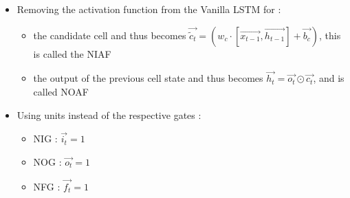 \begin{itemize}
  \item Removing the activation function from the Vanilla \ac{LSTM} for :
    \begin{itemize}
      \item the candidate cell and thus becomes $ \overrightarrow{\tilde{c}_t}=(w_c\cdot[\overrightarrow{x_{t-1}},\overrightarrow{h_{t-1}}] + \overrightarrow{b_c}) $, this is called the \ac{NIAF}
      \item the output of the previous cell state and thus becomes $ \overrightarrow{h_t}=\overrightarrow{o_t}\odot \overrightarrow{c_t} $, and is called \ac{NOAF}
    \end{itemize}
  \item Using units instead of the respective gates :
    \begin{itemize}
      \item \ac{NIG} : $\overrightarrow{i_t}=1$
      \item \ac{NOG} : $\overrightarrow{o_t}=1$
      \item \ac{NFG} : $\overrightarrow{f_t}=1$
    \end{itemize}
\end{itemize}
